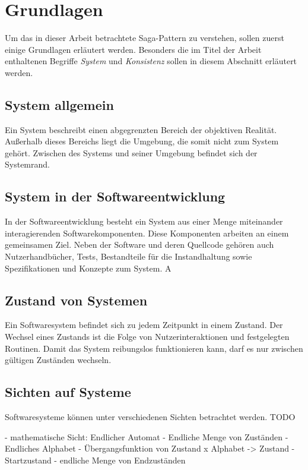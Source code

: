 \section{Grundlagen}

Um das in dieser Arbeit betrachtete Saga-Pattern zu verstehen, sollen zuerst einige Grundlagen erläutert werden. Besonders die im Titel der Arbeit enthaltenen Begriffe \textit{System} und \textit{Konsistenz} sollen in diesem Abschnitt erläutert werden. 

\subsection{System allgemein}
Ein System beschreibt einen abgegrenzten Bereich der objektiven Realität. Außerhalb dieses Bereichs liegt die Umgebung, die somit nicht zum System gehört. Zwischen des Systems und seiner Umgebung befindet sich der Systemrand. 


\subsection{System in der Softwareentwicklung}
In der Softwareentwicklung besteht ein System aus einer Menge miteinander interagierenden Softwarekomponenten. Diese Komponenten arbeiten an einem gemeinsamen Ziel. Neben der Software und deren Quellcode gehören auch Nutzerhandbücher, Tests, Bestandteile für die Instandhaltung sowie Spezifikationen und Konzepte zum System. A

\subsection{Zustand von Systemen}
Ein Softwaresystem befindet sich zu jedem Zeitpunkt in einem Zustand. Der Wechsel eines Zustands ist die Folge von Nutzerinteraktionen und festgelegten Routinen. Damit das System reibungslos funktionieren kann, darf es nur zwischen gültigen Zuständen wechseln. %

\subsection{Sichten auf Systeme}
Softwaresysteme können unter verschiedenen Sichten betrachtet werden. TODO


- mathematische Sicht: Endlicher Automat
- Endliche Menge von Zuständen
- Endliches Alphabet
- Übergangsfunktion von Zustand x Alphabet -> Zustand
- Startzustand
- endliche Menge von Endzuständen


